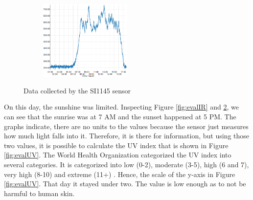 \documentclass{article}      %
\begin{document}
\begin{figure}[ht]
\begin{subfigure}[c]{0.5\textwidth}
\end{subfigure}
\par\medskip
\begin{subfigure}[c]{\textwidth}
\centering
\includegraphics[width=0.5\textwidth]{expEval/VIS_09-02-2018.PNG}
\label{fig:evalVIS}
\end{subfigure}
\caption{Data collected by the SI1145 sensor}
\end{figure}

On this day, the sunshine was limited. Inspecting Figure \ref{fig:evalIR} and \ref{fig:evalVIS}, we can see that the sunrise was at 7 AM and the sunset happened at 5 PM. The graphs indicate, there are no units to the values because the sensor just measures how much light falls into it. Therefore, it is there for information, but using those two values, it is possible to calculate the \gls{UV} index that is shown in Figure \ref{fig:evalUV}. The World Health Organization categorized the \gls{UV} index into several categories. It is categorized into low (0-2), moderate (3-5), high (6 and 7), very high (8-10) and extreme (11+) \cite{uvDesc}. Hence, the scale of the y-axis in Figure \ref{fig:evalUV}. That day it stayed under two. The value is low enough as to not be harmful to human skin.

\newpage
\end{document}
